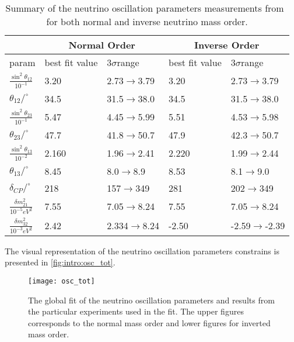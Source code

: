 \documentclass[../main.tex]{subfiles}
\begin{document}
\begin{table}[!ht]
\centering
  \begin{tabular}{||l|ll||ll|}
  \hline
  & \multicolumn{2}{c}{Normal Order} & \multicolumn{2}{c}{Inverse Order} \\
  \hline
  param                                   & best fit value  & 3$\sigma$range    & best fit value  & 3$\sigma$range \\
  \hline
  $\frac{\sin^2\theta_{12}}{10^{-1}}$     & 3.20            & 2.73$\to$3.79     & 3.20            & 2.73$\to$3.79 \\
  $\theta_{12}/^\circ$                    & 34.5            & 31.5$\to$38.0     & 34.5            & 31.5$\to$38.0 \\
  $\frac{\sin^2\theta_{23}}{10^{-1}}$     & 5.47            & 4.45$\to$5.99     & 5.51            & 4.53$\to$5.98 \\
  $\theta_{23}/^\circ$                    & 47.7            & 41.8$\to$50.7     & 47.9            & 42.3$\to$50.7 \\
  $\frac{\sin^2\theta_{13}}{10^{-2}}$     & 2.160           & 1.96$\to$2.41     & 2.220           & 1.99$\to$2.44 \\
  $\theta_{13}/^\circ$                    & 8.45            & 8.0$\to$8.9       & 8.53            & 8.1$\to$9.0 \\
  $\delta_{CP}/^\circ$                    & 218             & 157$\to$349       & 281             & 202$\to$349 \\
  $\frac{\delta m_{21}^2}{10^{-5}eV^2}$   & 7.55            & 7.05$\to$8.24     & 7.55            & 7.05$\to$8.24 \\
  $\frac{\delta m_{32}^2}{10^{-3}eV^2}$   & 2.42            & 2.334$\to$8.24    & -2.50           & -2.59$\to$-2.39 \\
  \hline

  \end{tabular}
  \caption{Summary of the neutrino oscillation parameters measurements from~\cite{Tanabashi2018} for both normal and inverse neutrino mass order.}
  \label{tbl:intro:osc}
\end{table}

The visual representation of the neutrino oscillation parameters constrains is presented in \autoref{fig:intro:osc_tot}.

\begin{figure}
  \centering
  \texttt{[image: osc\_tot]}
  \caption{The global fit of the neutrino oscillation parameters and results from the particular experiments used in the fit. The upper figures corresponds to the normal mass order and lower figures for inverted mass order.}
  \label{fig:intro:osc_tot}
\end{figure}
\end{document}
